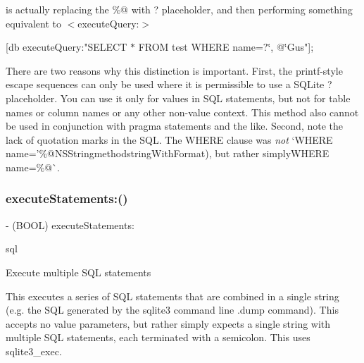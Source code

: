 is actually replacing the {\ttfamily \%@} with {\ttfamily ?} placeholder, and then performing something equivalent to {\ttfamily $<$execute\+Query\+:$>$}

\mbox{[}db execute\+Query\+:"S\+E\+L\+E\+CT $\ast$ F\+R\+OM test W\+H\+E\+RE name=?\char`\"{}, @\char`\"{}Gus"\mbox{]};

There are two reasons why this distinction is important. First, the printf-\/style escape sequences can only be used where it is permissible to use a S\+Q\+Lite {\ttfamily ?} placeholder. You can use it only for values in S\+QL statements, but not for table names or column names or any other non-\/value context. This method also cannot be used in conjunction with {\ttfamily pragma} statements and the like. Second, note the lack of quotation marks in the S\+QL. The {\ttfamily W\+H\+E\+RE} clause was {\itshape not} `W\+H\+E\+RE name='\%@N\+S\+String{\ttfamily method}string\+With\+Format{\ttfamily ), but rather simply}W\+H\+E\+RE name=\%@\`{}. \mbox{\label{interface_o_p_t_l_y_f_m_d_b_database_ad8c3bdc64c602dac7827a4f560928168}} 
\subsubsection{\texorpdfstring{execute\+Statements\+:()}{executeStatements:()}}
{\footnotesize\ttfamily -\/ (B\+O\+OL) execute\+Statements\+: \begin{DoxyParamCaption}\item[{(N\+S\+String $\ast$)}]{sql }\end{DoxyParamCaption}}

Execute multiple S\+QL statements

This executes a series of S\+QL statements that are combined in a single string (e.\+g. the S\+QL generated by the {\ttfamily sqlite3} command line {\ttfamily .dump} command). This accepts no value parameters, but rather simply expects a single string with multiple S\+QL statements, each terminated with a semicolon. This uses {\ttfamily sqlite3\+\_\+exec}.


